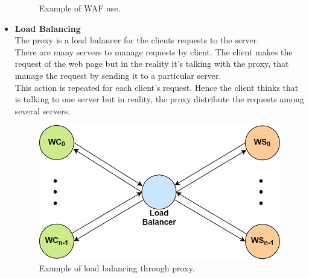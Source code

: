 \begin{itemize}
{\begin{figure}[h]
\caption{\footnotesize{Example of WAF use.}}\label{proxy_waf}
\end{figure}
}
\item{\textbf{Load Balancing}\\
The proxy is a load balancer for the clients requests to the server.\\
There are many servers to manage requests by client. The client makes the request of the web page but in the reality it's talking with the proxy, that manage the request by sending it to a particular server.\\
This action is repeated for each client's request. Hence the client thinks that is talking to one server but in reality, the proxy distribute the requests among several servers. 
\begin{figure}[h]
\centering
\includegraphics[scale=0.4]{Images/Gateway/proxy_load}
\caption{\footnotesize{Example of load balancing through proxy.}}\label{proxy_load}
\end{figure}
}
\end{itemize}

